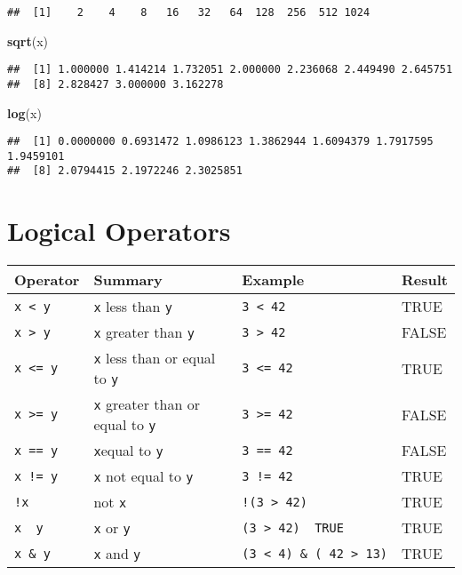\documentclass[]{book}
\newenvironment{Shaded}{\begin{snugshade}}{\end{snugshade}}
\newcommand{\KeywordTok}[1]{\textcolor[rgb]{0.13,0.29,0.53}{\textbf{#1}}}
\newcommand{\NormalTok}[1]{#1}
\begin{document}
\begin{verbatim}
##  [1]    2    4    8   16   32   64  128  256  512 1024
\end{verbatim}

\begin{Shaded}
\begin{Highlighting}[]
\KeywordTok{sqrt}\NormalTok{(x)}
\end{Highlighting}
\end{Shaded}

\begin{verbatim}
##  [1] 1.000000 1.414214 1.732051 2.000000 2.236068 2.449490 2.645751
##  [8] 2.828427 3.000000 3.162278
\end{verbatim}

\begin{Shaded}
\begin{Highlighting}[]
\KeywordTok{log}\NormalTok{(x)}
\end{Highlighting}
\end{Shaded}

\begin{verbatim}
##  [1] 0.0000000 0.6931472 1.0986123 1.3862944 1.6094379 1.7917595 1.9459101
##  [8] 2.0794415 2.1972246 2.3025851
\end{verbatim}

\hypertarget{logical-operators}{%
\section{Logical Operators}\label{logical-operators}}

\begin{longtable}[]{@{}llll@{}}
\toprule
Operator & Summary & Example & Result\tabularnewline
\midrule
\endhead
\texttt{x\ \textless{}\ y} & \texttt{x} less than \texttt{y} & \texttt{3\ \textless{}\ 42} & TRUE\tabularnewline
\texttt{x\ \textgreater{}\ y} & \texttt{x} greater than \texttt{y} & \texttt{3\ \textgreater{}\ 42} & FALSE\tabularnewline
\texttt{x\ \textless{}=\ y} & \texttt{x} less than or equal to \texttt{y} & \texttt{3\ \textless{}=\ 42} & TRUE\tabularnewline
\texttt{x\ \textgreater{}=\ y} & \texttt{x} greater than or equal to \texttt{y} & \texttt{3\ \textgreater{}=\ 42} & FALSE\tabularnewline
\texttt{x\ ==\ y} & \texttt{x}equal to \texttt{y} & \texttt{3\ ==\ 42} & FALSE\tabularnewline
\texttt{x\ !=\ y} & \texttt{x} not equal to \texttt{y} & \texttt{3\ !=\ 42} & TRUE\tabularnewline
\texttt{!x} & not \texttt{x} & \texttt{!(3\ \textgreater{}\ 42)} & TRUE\tabularnewline
\texttt{x\ \textbar{}\ y} & \texttt{x} or \texttt{y} & \texttt{(3\ \textgreater{}\ 42)\ \textbar{}\ TRUE} & TRUE\tabularnewline
\texttt{x\ \&\ y} & \texttt{x} and \texttt{y} & \texttt{(3\ \textless{}\ 4)\ \&\ (\ 42\ \textgreater{}\ 13)} & TRUE\tabularnewline
\bottomrule
\end{longtable}
\end{document}
